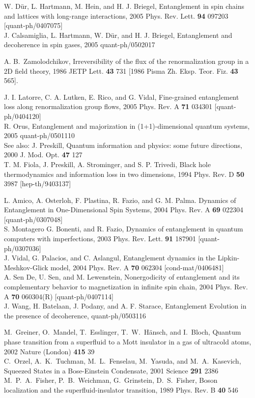 \documentclass[12pt,preprint,tighten,eqsecnum,aps,floats,psfig,epsfig,amsmath,onecolumn]{revtex4-1}
\begin{document}
{\begin{thebibliography}{99}
W. D\"ur, L. Hartmann, M. Hein, and H. J. Briegel,
Entanglement in spin chains and lattices with long-range interactions,
2005 Phys. Rev. Lett. {\bf 94} 097203 [quant-ph/0407075]\\
J. Calsamiglia, L. Hartmann, W. D\"ur, and H. J. Briegel,
Entanglement and decoherence in spin gases,
2005 quant-ph/0502017

%
 A. B.~Zamolodchikov, 
Irreversibility of the flux of the renormalization group in a 2D field theory,
1986 JETP Lett. {\bf 43} 731 [1986  Pisma Zh. Eksp. Teor. Fiz. {\bf 43} 565].
%


J. I. Latorre, C. A. Lutken, E. Rico, and G. Vidal,
Fine-grained entanglement loss along renormalization group flows,
2005 Phys. Rev. A {\bf 71} 034301 [quant-ph/0404120]\\
R. Orus, Entanglement and majorization in (1+1)-dimensional quantum systems,
2005  quant-ph/0501110 \\
See also:  J. Preskill, 
Quantum information and physics: some future directions,
2000 J. Mod. Opt. {\bf 47} 127 \\
T. M. Fiola, J. Preskill, A. Strominger, and S. P. Trivedi,
Black hole thermodynamics and information loss in two dimensions,
1994 Phys. Rev. D {\bf 50} 3987 [hep-th/9403137]
%


L. Amico, A. Osterloh, F. Plastina, R. Fazio, and G. M. Palma.
Dynamics of Entanglement in One-Dimensional Spin Systems,
2004 Phys. Rev. A {\bf 69} 022304 [quant-ph/0307048]\\
S. Montagero G. Bonenti, and R. Fazio,
Dynamics of entanglement in quantum computers with imperfections,
2003 Phys. Rev. Lett. {\bf 91} 187901 [quant-ph/0307036] \\
J. Vidal, G. Palacios, and C. Aslangul, 
Entanglement dynamics in the Lipkin-Meshkov-Glick model,
2004  Phys. Rev. A {\bf 70} 062304 [cond-mat/0406481]\\
A. Sen De, U. Sen, and M. Lewenstein,
Nonergodicity of entanglement and its complementary behavior to 
magnetization in infinite spin chain, 
2004 Phys. Rev. A {\bf 70} 060304(R) [quant-ph/0407114]\\
J. Wang, H. Batelaan, J. Podany, and A. F. Starace,
Entanglement Evolution in the presence of decoherence,
quant-ph/0503116


M.~Greiner, O.~Mandel, T.~Esslinger, T.~W.~H\"ansch, and I.~Bloch,
Quantum phase transition from a superfluid to a Mott insulator 
in a gas of ultracold atoms, 2002 Nature (London) {\bf 415} 39\\
C.~Orzel, A.~K.~Tuchman, M.~L.~Fenselau, M.~Yasuda, and
M.~A.~Kasevich, Squeezed States in a Bose-Einstein Condensate,
2001 Science {\bf 291} 2386\\
M.~P.~A.~Fisher, P.~B.~Weichman, G.~Grinstein, D.~S.~Fisher,
Boson localization and the superfluid-insulator transition,
1989 Phys. Rev. B {\bf 40} 546


\end{thebibliography}}
\end{document}
